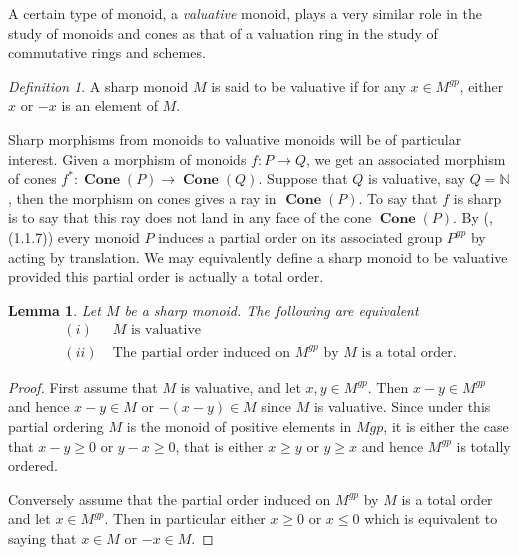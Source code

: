 \documentclass[12pt]{amsart}
\numberwithin{equation}{section}
\theoremstyle{plain}
\newtheorem{lem}[equation]{Lemma}
\theoremstyle{remark}
\newtheorem{defn}[equation]{Definition}
\DeclareMathOperator{\Cone}{\textbf{Cone}}
\newcommand{\NN}{\mathbb N}
\begin{document}
A certain type of monoid, a \emph{valuative} monoid, plays a very similar role in the study of monoids and cones as that of a valuation ring in the study of commutative rings and schemes. 
\begin{defn}\label{valMon}
	A sharp monoid $M$ is said to be valuative if for any $x\in M^{gp}$, either $x$ or $-x$ is an element of $M$.
\end{defn}
Sharp morphisms from monoids to valuative monoids will be of particular interest. Given a morphism of monoids $f:P\to Q$, we get an associated morphism of cones $f^*:\Cone(P)\to \Cone(Q)$. Suppose that $Q$ is valuative, say $Q = \NN$, then the morphism on cones gives a ray in $\Cone(P)$. To say that $f$ is sharp is to say that this ray does not land in any face of the cone $\Cone(P)$. By (\cite{Ogus}, (1.1.7)) every monoid $P$ induces a partial order on its associated group $P^{gp}$ by acting by translation. We may equivalently define a sharp monoid to be valuative provided this partial order is actually a total order.
\begin{lem}
	Let $M$ be a sharp monoid. The following are equivalent
	\begin{align*}
		(i) & \; M\text{ is valuative}\\
		(ii) & \; \text{The partial order induced on }M^{gp}\text{ by }M\text{ is a total order}.
	\end{align*}
\end{lem}
\begin{proof}
	First assume that $M$ is valuative, and let $x,y\in M^{gp}$. Then $x-y\in M^{gp}$ and hence $x-y\in M$ or $-(x-y)\in M$ since $M$ is valuative. Since under this partial ordering $M$ is the monoid of positive elements in $M{gp}$, it is either the case that $x-y\geq 0$ or $y-x\geq 0$, that is either $x\geq y$ or $y\geq x$ and hence $M^{gp}$ is totally ordered. 
	
	Conversely assume that the partial order induced on $M^{gp}$ by $M$ is a total order and let $x\in M^{gp}$. Then in particular either $x\geq 0$ or $x\leq 0$ which is equivalent to saying that $x\in M$ or $-x\in M$. 
\end{proof}
\end{document}
